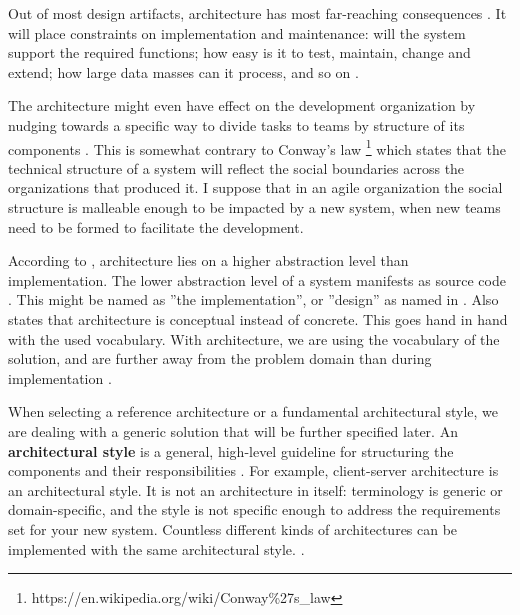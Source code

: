 \documentclass[utf8,english]{gradu3}
\begin{document}
Out of most design artifacts, architecture has most far-reaching consequences
\parencite[31]{Bass1998}. It will place constraints on implementation and
maintenance: will the system support the required functions;
how easy is it to test, maintain, change and extend; how large data masses can
it process, and so on \parencite{Koskimies2005}.

The architecture might even have effect on the development organization by
nudging towards a specific way to divide tasks to teams by structure of its
components \parencite[31]{Bass1998}. This is somewhat contrary to Conway's law
\footnote{https://en.wikipedia.org/wiki/Conway\%27s\_law} which states that the
technical structure of a system will reflect the social boundaries across the
organizations that produced it. I suppose that in an agile organization the
social structure is malleable enough to be impacted by a new system, when new
teams need to be formed to facilitate the development.

According to \textcite{Koskimies2005}, architecture lies on a higher
abstraction level than implementation. The lower abstraction level of a system
manifests as source code \parencite[24]{Bass1998}. This might be named as ''the
implementation'', or ''design'' as named in \textcite{IEEE12207}. Also \textcite[4]{IEEE42010} states
that architecture is conceptual instead of concrete. This goes hand in hand with
the used vocabulary. With architecture, we are using the vocabulary of the
solution, and are further away from the problem domain than during
implementation \parencite{Koskimies2005}.

When selecting a reference architecture or a fundamental
architectural style, we are dealing with a generic solution that will be further
specified later. An \textbf{architectural style} is a general, high-level guideline for
structuring the components and their responsibilities \parencite[24]{Bass1998}. For
example, client-server architecture is an architectural style. It is not an
architecture in itself: terminology is generic or domain-specific, and the style
is not specific enough to address the requirements set for your new system.
Countless different kinds of architectures can be implemented with the same
architectural style. \parencite[24]{Bass1998}.
\end{document}
